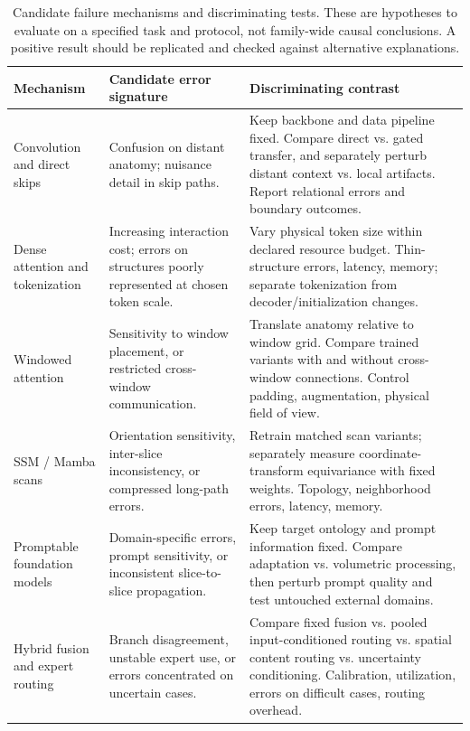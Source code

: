 \documentclass[5p,times,authoryear]{elsarticle}
\begin{document}
\begin{table}[t]
\centering
\caption{Candidate failure mechanisms and discriminating tests. These are hypotheses to evaluate on a specified task and protocol, not family-wide causal conclusions. A positive result should be replicated and checked against alternative explanations.}
\label{tab:failure_matrix}
\footnotesize
\renewcommand{\arraystretch}{1.16}
\setlength{\tabcolsep}{4pt}
\begin{tabular}{>{\raggedright\arraybackslash}p{2.65cm}>{\raggedright\arraybackslash}p{4.55cm}>{\raggedright\arraybackslash}p{8.95cm}}
\toprule
\textbf{Mechanism} & \textbf{Candidate error signature} & \textbf{Discriminating contrast} \\
\midrule
Convolution and direct skips & Confusion on distant anatomy; nuisance detail in skip paths. & Keep backbone and data pipeline fixed. Compare direct vs. gated transfer, and separately perturb distant context vs. local artifacts. Report relational errors and boundary outcomes. \\
Dense attention and tokenization & Increasing interaction cost; errors on structures poorly represented at chosen token scale. & Vary physical token size within declared resource budget. Thin-structure errors, latency, memory; separate tokenization from decoder/initialization changes. \\
Windowed attention & Sensitivity to window placement, or restricted cross-window communication. & Translate anatomy relative to window grid. Compare trained variants with and without cross-window connections. Control padding, augmentation, physical field of view. \\
SSM / Mamba scans & Orientation sensitivity, inter-slice inconsistency, or compressed long-path errors. & Retrain matched scan variants; separately measure coordinate-transform equivariance with fixed weights. Topology, neighborhood errors, latency, memory. \\
Promptable foundation models & Domain-specific errors, prompt sensitivity, or inconsistent slice-to-slice propagation. & Keep target ontology and prompt information fixed. Compare adaptation vs. volumetric processing, then perturb prompt quality and test untouched external domains. \\
Hybrid fusion and expert routing & Branch disagreement, unstable expert use, or errors concentrated on uncertain cases. & Compare fixed fusion vs. pooled input-conditioned routing vs. spatial content routing vs. uncertainty conditioning. Calibration, utilization, errors on difficult cases, routing overhead. \\
\bottomrule
\end{tabular}
\end{table}
\end{document}
